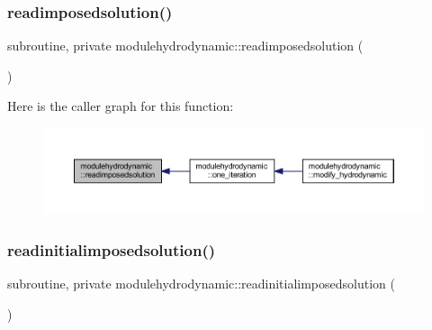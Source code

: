 \subsubsection{\texorpdfstring{readimposedsolution()}{readimposedsolution()}}
{\footnotesize\ttfamily subroutine, private modulehydrodynamic\+::readimposedsolution (\begin{DoxyParamCaption}{ }\end{DoxyParamCaption})\hspace{0.3cm}{\ttfamily [private]}}

Here is the caller graph for this function\+:\nopagebreak
\begin{figure}[H]
\begin{center}
\leavevmode
\includegraphics[width=350pt]{namespacemodulehydrodynamic_aeb9df81c7e232565cec18de1a51923d0_icgraph}
\end{center}
\end{figure}
\mbox{\label{namespacemodulehydrodynamic_a8c1095168f036a4615b7ef4ad633717b}} 
\subsubsection{\texorpdfstring{readinitialimposedsolution()}{readinitialimposedsolution()}}
{\footnotesize\ttfamily subroutine, private modulehydrodynamic\+::readinitialimposedsolution (\begin{DoxyParamCaption}{ }\end{DoxyParamCaption})\hspace{0.3cm}{\ttfamily [private]}}

